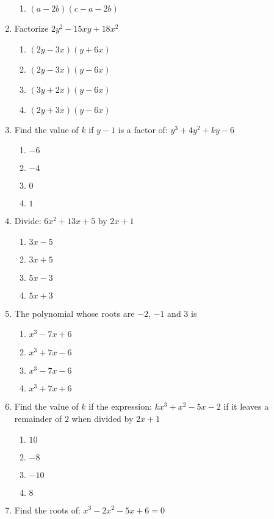 \begin{multicols}{2}
\begin{enumerate}[label={\arabic*.}]
\begin{enumerate}[label={\Alph*.}]
	\item \((a-2b)(c-a-2b)\)
	\end{enumerate}
\item Factorize \(2y^2 - 15xy + 18x^2\)
	\begin{enumerate}[label={\Alph*.}]
	\item \((2y - 3x)(y + 6x)\)
	\item \((2y -3x)(y-6x)\)
	\item \((3y + 2x )(y -6x)\)
	\item \((2y + 3x)(y-6x)\)
	\end{enumerate}
\item Find the value of \(k\) if \(y - 1\) is a factor of: \(y^3 + 4y^2 + ky - 6 \)
	\begin{enumerate}[label={\Alph*.}]
	\item \(-6\)
	\item \(-4\)
	\item \(0\)
	\item \(1\)
	\end{enumerate}
\item Divide: \(6x^2 + 13x + 5\) by \(2x + 1\) 
	\begin{enumerate}[label={\Alph*.}]
	\item \(3x -5\)
	\item \(3x + 5\)
	\item \(5x -3\)
	\item \(5x + 3\)
	\end{enumerate}
\item The polynomial whose roots are \(-2\), \(-1\) and \(3\) is
	\begin{enumerate}[label={\Alph*.}]
	\item \(x^3 - 7x + 6\)
	\item \(x^3 + 7x -6\)
	\item \(x^3 -7x -6\)
	\item \(x^3 +7x +6\)
	\end{enumerate}
\item Find the value of \(k\) if the expression: \(kx^3 + x^2 -5x -2\) if it  leaves a remainder of \(2\) when divided by \(2x+1\)
	\begin{enumerate}[label={\Alph*.}]
	\item \(10\)
	\item \(-8\)
	\item \(-10\)
	\item \(8\)
	\end{enumerate}
\item Find the roots of: \(x^3 - 2x^2 - 5x + 6 = 0\)

\end{enumerate}
\end{multicols}
